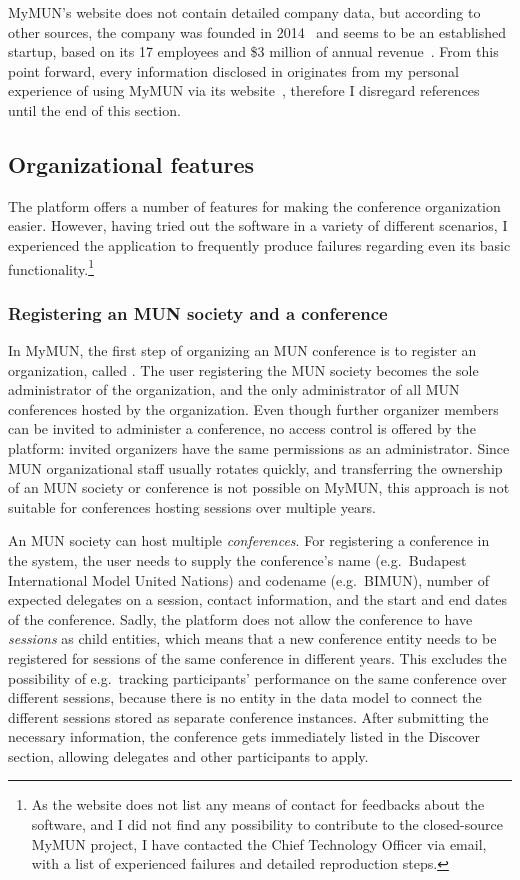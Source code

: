 MyMUN's website does not contain detailed company data, but according to other sources, the company was founded in 2014~\cite{mymunfacebook} and seems to be an established startup, based on its 17 employees and \$3 million of annual revenue~\cite{mymunzoominfo}. From this point forward, every information disclosed in  originates from my personal experience of using MyMUN via its website~\cite{mymunwebsite}, therefore I disregard references until the end of this section.

\subsection{Organizational features}

The platform offers a number of features for making the conference organization easier. However, having tried out the software in a variety of different scenarios, I experienced the application to frequently produce failures regarding even its basic functionality.\footnote{As the website does not list any means of contact for feedbacks about the software, and I did not find any possibility to contribute to the closed-source MyMUN project, I have contacted the Chief Technology Officer via email, with a list of experienced failures and detailed reproduction steps.}

\subsubsection{Registering an MUN society and a conference}

In MyMUN, the first step of organizing an MUN conference is to register an organization, called . The user registering the MUN society becomes the sole administrator of the organization, and the only administrator of all MUN conferences hosted by the organization. Even though further organizer members can be invited to administer a conference, no access control is offered by the platform: invited organizers have the same permissions as an administrator. Since MUN organizational staff usually rotates quickly, and transferring the ownership of an MUN society or conference is not possible on MyMUN, this approach is not suitable for conferences hosting sessions over multiple years.

An MUN society can host multiple \emph{conferences}. For registering a conference in the system, the user needs to supply the conference's name (e.g.\ Budapest International Model United Nations) and codename (e.g.\ BIMUN), number of expected delegates on a session, contact information, and the start and end dates of the conference. Sadly, the platform does not allow the conference to have \emph{sessions} as child entities, which means that a new conference entity needs to be registered for sessions of the same conference in different years. This excludes the possibility of e.g.\ tracking participants' performance on the same conference over different sessions, because there is no entity in the data model to connect the different sessions stored as separate conference instances. After submitting the necessary information, the conference gets immediately listed in the Discover section, allowing delegates and other participants to apply.

